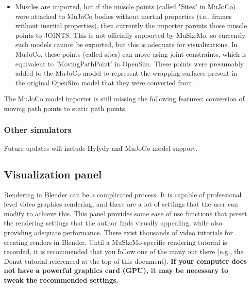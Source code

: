 \documentclass{article}
\begin{document}
\begin{itemize}
\item Muscles are imported, but if the muscle points (called "Sites" in MuJoCo) were attached to MuJoCo bodies without inertial properties (i.e., frames without inertial properties), then currently the importer parents those muscle points to JOINTS. This is not officially supported by MuSkeMo, so currently such models cannot be exported, but this is adequate for visualizations. In MuJoCo, these points (called sites) can move using joint constraints, which is equivalent to 'MovingPathPoint' in OpenSim. These points were presumably added to the MuJoCo model to represent the wrapping surfaces present in the original OpenSim model that they were converted from.


\end{itemize}

The MuJoCo model importer is still missing the following features: conversion of moving path points to static path points.

\subsubsection{Other simulators}

Future updates will include Hyfydy and MuJoCo model support.


\subsection{Visualization panel}
\label{sec:visualizationpanel}
Rendering in Blender can be a complicated process. It is capable of professional level video graphics rendering, and there are a lot of settings that the user can modify to achieve this. This panel provides some ease of use functions that preset the rendering settings that the author finds visually appealing, while also providing adequate performance. There exist thousands of video tutorials for creating renders in Blender. Until a MuSkeMo-specific rendering tutorial is recorded, it is recommended that you follow one of the many out there (e.g., the Donut tutorial referenced at the top of this document). \textbf{If your computer does not have a powerful graphics card (GPU), it may be necessary to tweak the recommended settings.} 
\end{document}
